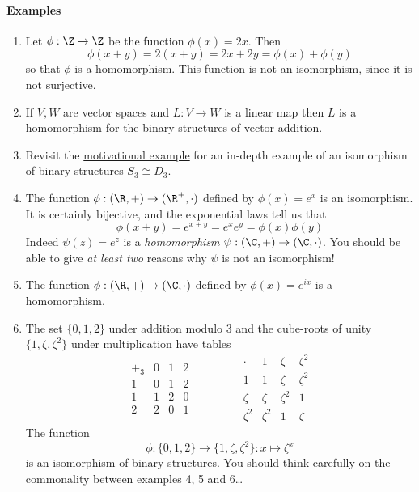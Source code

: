 \paragraph{Examples}
\begin{enumerate}
  \item Let $\phi:\Z\to\Z$ be the function $\phi(x)=2x$. Then
  \[\phi(x+y)=2(x+y)=2x+2y=\phi(x)+\phi(y)\]
  so that $\phi$ is a homomorphism. This function is not an isomorphism, since it is not surjective.
  \item If $V,W$ are vector spaces and $L:V\to W$ is a linear map then $L$ is a homomorphism for the binary structures of vector addition.
  \item Revisit the \hyperlink{sec:motiv}{motivational example} for an in-depth example of an isomorphism of binary structures $S_3\cong D_3$.
  \item The function $\phi:(\R,+)\to(\R^+,\cdot)$ defined by $\phi(x)=e^x$ is an isomorphism. It is certainly bijective, and the exponential laws tell us that
  \[\phi(x+y)=e^{x+y}=e^xe^y=\phi(x)\phi(y)\]
  Indeed $\psi(z)=e^z$ is a \emph{homomorphism} $\psi:(\C,+)\to(\C,\cdot)$. You should be able to give \emph{at least two} reasons why $\psi$ is not an isomorphism!
  \item The function $\phi:(\R,+)\to (\C,\cdot)$ defined by $\phi(x)=e^{ix}$ is a homomorphism.
  \item The set $\{0,1,2\}$ under addition modulo 3 and the cube-roots of unity $\{1,\zeta,\zeta^2\}$ under multiplication have tables
	\[\begin{array}{c||c|c|c}
	+_3 & 0 & 1 & 2 \\
	\hline\hline 1 & 0 & 1 & 2\\
	\hline 1 & 1 & 2 & 0\\
	\hline 2 & 2 & 0 & 1
	\end{array}
	\qquad\qquad 
	\begin{array}{c||c|c|c}
		\cdot & 1 & \zeta & \zeta^2 \\
		\hline\hline 1 & 1 & \zeta & \zeta^2\\
		\hline \zeta & \zeta & \zeta^2 & 1\\
		\hline \zeta^2 & \zeta^2 & 1 & \zeta
  \end{array}\]
	The function
	\[\phi:\{0,1,2\}\to\{1,\zeta,\zeta^2\}:x\mapsto \zeta^x\]
	is an isomorphism of binary structures. You should think carefully on the commonality between examples 4, 5 and 6\ldots
\end{enumerate}


